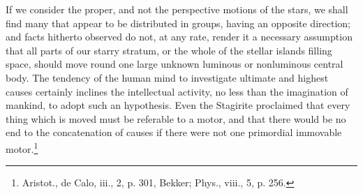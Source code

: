 If we consider the proper, and not the perspective motions of the stars, we shall find many that appear to be distributed in groups, having an opposite direction; and facts hitherto observed do not, at any rate, render it a necessary assumption that all parts of our starry stratum, or the whole of the stellar islands filling space, should move round one large unknown luminous or nonluminous central body. The tendency of the human mind to investigate ultimate and highest causes certainly inclines the intellectual activity, no less than the imagination of mankind, to adopt such an hypothesis. Even the Stagirite proclaimed that every thing which is moved must be referable to a motor, and that there would be no end to the concatenation of causes if there were not one primordial immovable motor.\footnote{Aristot., de Calo, iii., 2, p. 301, Bekker; Phys., viii., 5, p. 256.}

